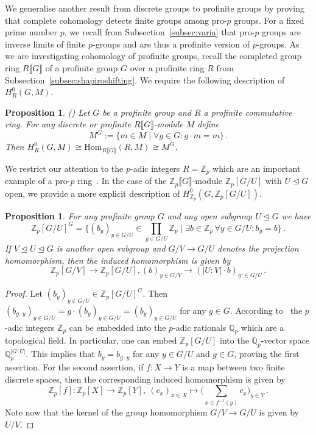 \documentclass[12pt, a4paper]{article}
\numberwithin{equation}{section}
\newtheorem{prop}[thm]{Proposition}
\theoremstyle{empty}
\theoremstyle{nonumberplain}
\newtheorem{proof}{Proof}
\begin{document}
We generalise another result from discrete groups to profinite groups by proving that complete cohomology detects finite groups among pro-$p$ groups. For a fixed prime number $p$, we recall from Subsection~\ref{subsec:varia} that pro-$p$ groups are inverse limits of finite $p$-groups and are thus a profinite version of $p$-groups. As we are investigating cohomology of profinite groups, recall the completed group ring $R{\llbracket}G{\rrbracket}$ of a profinite group $G$ over a profinite ring $R$ from Subsection~\ref{subsec:shapiroshifting}. We require the following description of $H_R^0(G, M)$.

\begin{prop}\label{prop:zeroethgaloiscohom}
(\cite[Lemma~6.2.1]{rib10}) Let $G$ be a profinite group and $R$ a profinite commutative ring. For any discrete or profinite $R{\llbracket}G{\rrbracket}$-module $M$ define
\[ M^G := \lbrace m \in M \mid \forall g \in G: g \cdot m = m \rbrace \, . \]
Then $H_R^0(G, M) \cong \mathrm{Hom}_{R{\llbracket}G{\rrbracket}}(R, M) \cong M^G$.
\end{prop}

We restrict our attention to the $p$-adic integers $R = \mathbb{Z}_p$ which are an important example of a pro-$p$ ring~\cite[Section~1.5]{wil98}. In the case of the $\mathbb{Z}_p{\llbracket}G{\rrbracket}$-module $\mathbb{Z}_p[G/U]$ with $U \trianglelefteq G$ open, we provide a more explicit description of $H_{\mathbb{Z}_p}^0(G, \mathbb{Z}_p[G/U])$.

\begin{prop}\label{prop:specialzeroethcohom}
For any profinite group $G$ and any open subgroup $U \trianglelefteq G$ we have
\[ \mathbb{Z}_p[G/U]^G = \Big\lbrace (b_y)_{y \in G/U} \in \prod_{y \in G/U} \mathbb{Z}_p \mid \exists b \in \mathbb{Z}_p \, \forall y \in G/U: b_y = b \Big\rbrace \, . \]
If $V \trianglelefteq U \trianglelefteq  G$ is another open subgroup and $G/V \rightarrow G/U$ denotes the projection homomorphism, then the induced homomorphism is given by
\[ \mathbb{Z}_p[G/V] \rightarrow \mathbb{Z}_p[G/U], (b)_{y \in G/V} \rightarrow (|U:V| \cdot b)_{y' \in G/U} \, . \]
\end{prop}

\begin{proof}
Let $(b_y)_{y \in G/U} \in \mathbb{Z}_p[G/U]^G$. Then $(b_{g \cdot y})_{y \in G/U} = g \cdot (b_y)_{y \in G/U} = (b_y)_{y \in G/U}$ for any $g \in G$. According to~\cite[Section~0.9]{dix99} the $p$-adic integers $\mathbb{Z}_p$ can be embedded into the $p$-adic rationals $\mathbb{Q}_p$ which are a topological field. In particular, one can embed $\mathbb{Z}_p[G/U]$ into the $\mathbb{Q}_p$-vector space $\mathbb{Q}_p^{|G:U|}$. This implies that $b_y = b_{g \cdot y}$ for any $y \in G/U$ and $g \in G$, proving the first assertion. For the second assertion, if $f: X \rightarrow Y$ is a map between two finite discrete spaces, then the corresponding induced homomorphism is given by
\[ \mathbb{Z}_p[f]: \mathbb{Z}_p[X] \rightarrow \mathbb{Z}_p[Y], \: (c_x)_{x \in X} \mapsto \Big(\sum_{x \in f^{-1}(y)} c_x \Big)_{y \in Y} \, . \]
Note now that the kernel of the group homomorphism $G/V \rightarrow G/U$ is given by $U/V$.
\end{proof}
\end{document}
